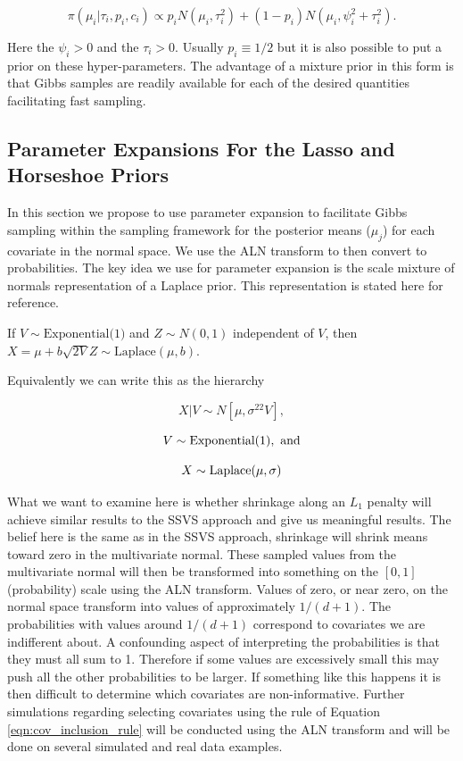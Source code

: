 \begin{equation}
\pi(\mu_i\vert \tau_i, p_i, c_i) \propto p_iN(\mu_i, \tau_i^2)+(1-p_i)N(\mu_i, \psi^2_i+\tau_i^2).
\end{equation}

Here the $\psi_i >0$ and the $\tau_i>0$. Usually $p_i\equiv1/2$ but it is also possible to put a prior on these hyper-parameters. The advantage of a mixture prior in this form is that Gibbs samples are readily available for each of the desired quantities facilitating fast sampling.     

\subsection{Parameter Expansions For the Lasso and Horseshoe Priors}
In this section we propose to use parameter expansion to facilitate Gibbs sampling within the sampling framework for the posterior means ($\mu_j$) for each covariate in the normal space. We use the ALN transform to then convert to probabilities. 
The key idea we use for parameter expansion is the scale mixture of normals representation of a Laplace prior. This representation is stated here for reference.

If $V \sim \text{Exponential(1)}$ and $Z \sim N(0, 1)$ independent of $V$, then $X = \mu + b \sqrt{2 V}Z \sim \mathrm{Laplace}(\mu,b)$. 

Equivalently we can write this as the hierarchy

\begin{equation}\label{eqn:normal_cond_lhood_lasso}
X \vert V \sim N[\mu, \sigma^22V],
\end{equation}

\begin{equation}\newnot{symbol:exponential_dist}
V \sim \text{Exponential}(1), \text{ and}
\end{equation}

\begin{equation}\newnot{symbol:laplace_dist}
X \sim \text{Laplace}(\mu, \sigma)
\end{equation}

What we want to examine here is whether shrinkage along an $L_1$ penalty will achieve similar results to the SSVS approach and give us meaningful results. The belief here is the same as in the SSVS approach, shrinkage will shrink means toward zero in the multivariate normal. These sampled values from the multivariate normal will then be transformed into something on the $[0,1]$ (probability) scale using the ALN transform. Values of zero, or near zero, on the normal space transform into values of approximately $1/(d+1)$. The probabilities with values around $1/(d+1)$ correspond to covariates we are indifferent about. A confounding aspect of interpreting the probabilities is that they must all sum to 1. Therefore if some values are excessively small this may push all the other probabilities to be larger. If something like this happens it is then difficult to determine which covariates are non-informative. Further simulations regarding selecting covariates using the rule of Equation \ref{eqn:cov_inclusion_rule} will be conducted using the ALN transform and will be done on several simulated and real data examples.    

